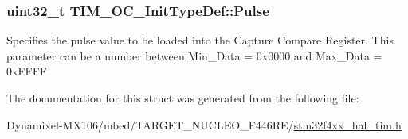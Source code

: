 \subsubsection[{\texorpdfstring{Pulse}{Pulse}}]{\setlength{\rightskip}{0pt plus 5cm}uint32\+\_\+t T\+I\+M\+\_\+\+O\+C\+\_\+\+Init\+Type\+Def\+::\+Pulse}\hypertarget{struct_t_i_m___o_c___init_type_def_a61fb5b9ef4154de67620ac81085a0e39}{}\label{struct_t_i_m___o_c___init_type_def_a61fb5b9ef4154de67620ac81085a0e39}
Specifies the pulse value to be loaded into the Capture Compare Register. This parameter can be a number between Min\+\_\+\+Data = 0x0000 and Max\+\_\+\+Data = 0x\+F\+F\+FF 

The documentation for this struct was generated from the following file\+:\begin{DoxyCompactItemize}
\item 
Dynamixel-\/\+M\+X106/mbed/\+T\+A\+R\+G\+E\+T\+\_\+\+N\+U\+C\+L\+E\+O\+\_\+\+F446\+R\+E/\hyperlink{stm32f4xx__hal__tim_8h}{stm32f4xx\+\_\+hal\+\_\+tim.\+h}\end{DoxyCompactItemize}
